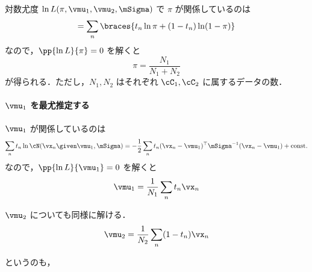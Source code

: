 対数尤度 $\ln L(\pi, \vmu_1, \vmu_2, \mSigma)$ で $\pi$ が関係しているのは
\begin{equation}
   = \sum_n \braces{t_n \ln \pi + (1-t_n)\ln(1 - \pi)}
\end{equation}
なので，$\pp{\ln L}{\pi} = 0$ を解くと
\begin{equation}
  \pi = \frac{N_1}{N_1 + N_2}
\end{equation}
が得られる．ただし，$N_1,N_2$ はそれぞれ $\cC_1, \cC_2$ に属するデータの数．

\paragraph{$\vmu_1$ を最尤推定する}

$\vmu_1$ が関係しているのは
\begin{equation}
  \sum_n t_n \ln \cN(\vx_n \given \vmu_1, \mSigma) = - \frac{1}{2} \sum_n t_n (\vx_n - \vmu_1)^\top \mSigma^{-1} (\vx_n - \vmu_1) + \mathrm{const.}
\end{equation}
なので，$\pp{\ln L}{\vmu_1} = 0$ を解くと
\begin{equation}
  \vmu_1 = \frac{1}{N_1} \sum_n t_n \vx_n
\end{equation}

$\vmu_2$ についても同様に解ける．
\begin{equation}
  \vmu_2 = \frac{1}{N_2} \sum_n (1 - t_n) \vx_n
\end{equation}

というのも，